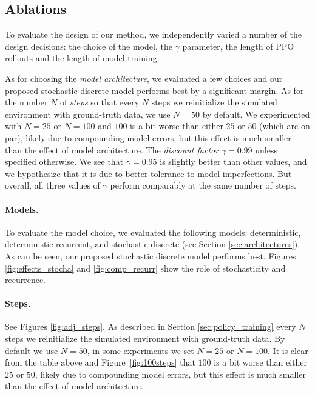 \subsection{Ablations}\label{sec:ablations}

To evaluate the design of our method, we independently varied a number of the design decisions: the choice of the model, the $\gamma$ parameter, the length of PPO rollouts and the length of model training.

As for choosing the \emph{model architecture}, we evaluated a few choices and our proposed stochastic discrete model performs best by a significant margin.
As for the number $N$ of \emph{steps} so that every $N$ steps we reinitialize the simulated environment with ground-truth data, we use $N=50$ by default. We experimented with $N=25$ or $N=100$ and $100$ is a bit worse than either $25$ or $50$ (which are on par), likely due to compounding model errors, but this effect is much smaller than the effect of model architecture. The \emph{discount factor} $\gamma=0.99$ unless specified otherwise.  We see that $\gamma=0.95$ is slightly better than other values, and we hypothesize that it is due to better tolerance to model imperfections. But overall, all three values of $\gamma$ perform comparably at the same number of steps.

\paragraph{Models.} To evaluate the model choice, we evaluated the following models: deterministic, deterministic recurrent, and stochastic discrete (see Section \ref{sec:architectures}). As can be seen, our proposed stochastic discrete model performs best. Figures \ref{fig:effects_stocha} and \ref{fig:comp_recurr} show the role of stochasticity and recurrence. 

\paragraph{Steps.} See Figures \ref{fig:adj_steps}. As described in Section \ref{sec:policy_training} every $N$ steps we reinitialize the simulated environment with ground-truth data. By default we use $N=50$, in some experiments 
we set $N=25$ or $N=100$. It is clear from the table above and Figure~\ref{fig:100steps} that $100$ is a bit worse than either $25$ or $50$, likely due to compounding model errors,
but this effect is much smaller than the effect of model architecture.

